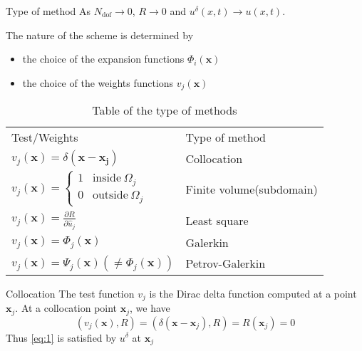\begin{frame}{Type of method}
  As $N_{\text{dof}} \rightarrow 0$, $R \rightarrow 0$ and
  $u^{\delta}(x,t) \rightarrow u(x,t)$.

  The nature of the scheme is determined by
  \begin{itemize}
  \item the choice of the expansion functions $\Phi_i(\mathbf{x})$
  \item the choice of the weights functions $v_j(\mathbf{x})$
  \end{itemize}

  \begin{table}[H]
    \centering

    \begin{tabular}[c]{ll}
    \rowcolor[gray]{1}
    Test/Weights & Type of method\\

    \rowcolor[gray]{.7}
    $v_j(\mathbf{x}) = \delta(\mathbf{x} - \mathbf{x_j})$ 	& Collocation \\


    \rowcolor[gray]{1}
    $v_j(\mathbf{x})=
      \begin{cases}
        1 & \text{inside} \ \Omega_j\\
        0 & \text{outside} \ \Omega_j
      \end{cases}$ & Finite volume(subdomain)\\

    \rowcolor[gray]{.7}
    $v_j(\mathbf{x}) = \frac{\partial R}{\partial \hat{u}_j}$ & Least square\\

    \rowcolor[gray]{1}
    $v_j(\mathbf{x}) = \Phi_j(\mathbf{x})$ & Galerkin\\

    \rowcolor[gray]{.7}
    $v_j(\mathbf{x}) = \Psi_j(\mathbf{x}) (\neq \Phi_j(\mathbf{x}))$ & Petrov-Galerkin\\
    \end{tabular}
    \caption{Table of the type of methods}
    \label{tab:1}
  \end{table}

\end{frame}

\begin{frame}{Collocation}
  The test function $v_j$ is the Dirac delta function computed at a point $\mathbf{x}_j$.
  At a collocation point $\mathbf{x}_j$, we have
  \begin{equation}
    \label{eq:6}
    ( v_j(\mathbf{x}), R ) = ( \delta(\mathbf{x} - \mathbf{x}_j), R ) =  R(\mathbf{x}_j) = 0
  \end{equation}
  Thus \eqref{eq:1} is satisfied by $u^{\delta}$ at $\mathbf{x}_j$
\end{frame}

